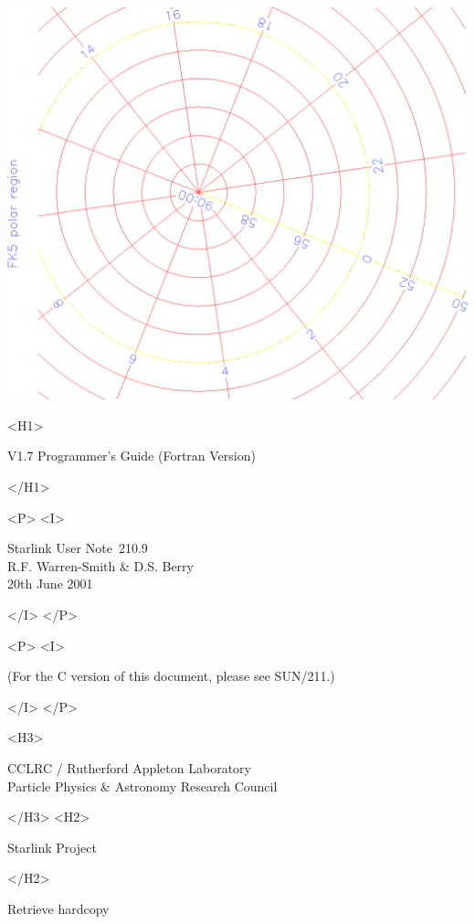 \documentclass[twoside,11pt]{article}
\newcommand{\stardoccategory}  {Starlink User Note}
\newcommand{\stardocsource}    {sun\stardocnumber}
\newcommand{\stardocnumber}    {210.9}
\newcommand{\stardocauthors}   {R.F. Warren-Smith \& D.S. Berry}
\newcommand{\stardocdate}      {20th June 2001}
\newcommand{\stardocversion}   {V1.7}
\newcommand{\stardocmanualhtml}{Programmer's Guide (Fortran Version)}
\newcommand{\htmladdnormallink}[2]{#1}
\newcommand{\htmladdimg}[1]{}
\newcommand{\xref}[3]{#1}
\begin{document}
\begin{htmlonly}
   \includegraphics[scale=0.3,angle=-90]{sun210_figures/frontc.eps}

   \begin{rawhtml} <H1> \end{rawhtml}
      \stardocversion
      \stardocmanualhtml
   \begin{rawhtml} </H1> \end{rawhtml}
   \begin{rawhtml} <P> <I> \end{rawhtml}
   \stardoccategory\ \stardocnumber \\
   \stardocauthors \\
   \stardocdate
   \begin{rawhtml} </I> </P> \end{rawhtml}
   \begin{rawhtml} <P> <I> \end{rawhtml}
   (For the C version of this document, please see \xref{SUN/211}{sun211}{}.)
   \begin{rawhtml} </I> </P> \end{rawhtml}
   \begin{rawhtml} <H3> \end{rawhtml}
      \htmladdnormallink{CCLRC}{http://www.cclrc.ac.uk} /
      \htmladdnormallink{Rutherford Appleton Laboratory}
                        {http://www.cclrc.ac.uk/ral} \\
      \htmladdnormallink{Particle Physics \& Astronomy Research Council}
                        {http://www.pparc.ac.uk} \\
   \begin{rawhtml} </H3> <H2> \end{rawhtml}
      \htmladdnormallink{Starlink Project}{http://www.starlink.rl.ac.uk/}
   \begin{rawhtml} </H2> \end{rawhtml}
   \htmladdnormallink{\htmladdimg{source.gif} Retrieve hardcopy}
      {http://www.starlink.rl.ac.uk/cgi-bin/hcserver?\stardocsource}\\


\end{htmlonly}
\end{document}
